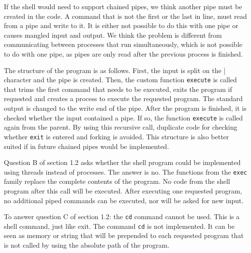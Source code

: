 \documentclass[11pt]{article}
\begin{document}
If the shell would need to support chained pipes, we think another pipe must be created in the code. A command that is not the first or the last in line, must read from a pipe and write to it. It is either not possible to do this with one pipe or causes mangled input and output. We think the problem is different from communicating between processes that run simultaneously, which is not possible to do with one pipe, as pipes are only read after the previous process is finished.

The structure of the program is as follows. First, the input is split on the | character and the pipe is created. Then, the custom function \texttt{execute} is called that trims the first command that needs to be executed, exits the program if requested and creates a process to execute the requested program. The standard output is changed to the write end of the pipe. After the program is finished, it is checked whether the input contained a pipe. If so, the function \texttt{execute} is called again from the parent. By using this recursive call, duplicate code for checking whether \texttt{exit} is entered and forking is avoided. This structure is also better suited if in future chained pipes would be implemented.

Question B of section 1.2 asks whether the shell program could be implemented using threads instead of processes. The answer is no. The functions from the \texttt{exec} family replace the complete contents of the program. No code from the shell program after this call will be executed. After executing one requested program, no additional piped commands can be executed, nor will be asked for new input.

To answer question C of section 1.2: the \texttt{cd} command cannot be used. This is a shell command, just like exit. The command \texttt{cd} is not implemented. It can be seen as memory or string that will be prepended to each requested program that is not called by using the absolute path of the program.
\end{document}
